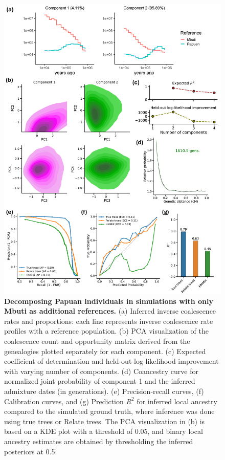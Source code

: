 \begin{figure}[h!]
    \centering
    \includegraphics[width=\linewidth]{figures/gb_sims/gb_sim_deni_ghost.pdf}
    \captionsetup{width=\textwidth+3cm}     \caption{
    \footnotesize
    \textbf{Decomposing Papuan individuals in simulations with only Mbuti as additional references.} (a) Inferred inverse coalescence rates and proportions: each line represents inverse coalescence rate profiles with a reference population. (b) PCA visualization of the coalescence count and opportunity matrix derived from the genealogies plotted separately for each component. (c) Expected coefficient of determination and held-out log-likelihood improvement with varying number of components. (d) Coancestry curve for normalized joint probability of component 1 and the inferred admixture dates (in generations). (e) Precision-recall curves, (f) Calibration curves, and (g) Prediction $R^2$ for inferred local ancestry compared to the simulated ground truth, where inference was done using true trees or Relate trees. The PCA visualization in (b) is based on a KDE plot with a threshold of 0.05, and binary local ancestry estimates are obtained by thresholding the inferred posteriors at 0.5.
    }
    \label{fig:gb_sim_deni_ghost}
\end{figure}

